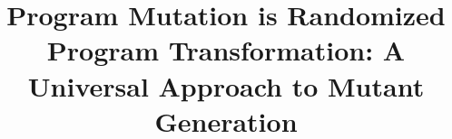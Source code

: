 \documentclass[sigconf,review, anonymous]{acmart}
\begin{document}
\title{Program Mutation is Randomized Program Transformation: A
  Universal Approach to Mutant Generation}




\newcommand{\mr}[2]{\multirow{#1}{*}{#2}}
\newcommand{\mc}[3]{\multicolumn{#1}{#2}{#3}}
\newcommand{\um}{\texttt{universalmutator}\xspace}
\newcommand{\clg}[1]{\textcolor{blue}{#1}}
\newcommand{\adg}[1]{\textcolor{purple}{#1}}
\newcommand{\kj}[1]{\textcolor{olive}{#1}}

\newcommand{\averageprojvariance}{402}
\newcommand{\averagevariance}{604}
\newcommand{\outliertotalfiles}{26}
\newcommand{\outliertestissues}{12}
\newcommand{\outlierumissues}{7}
\newcommand{\outlierunclear}{7}
\newcommand{\allcorr}{0.7479}
\newcommand{\covcorr}{0.2066}
\newcommand{\allrsquared}{0.573}
\newcommand{\allr}{0.757}
\newcommand{\covrsquared}{0.021}
\newcommand{\covr}{0.145}
\end{document}
